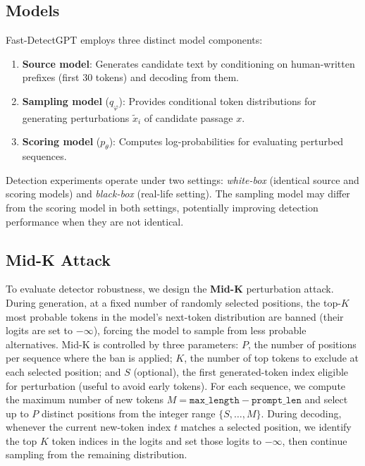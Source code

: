 \documentclass[11pt]{article}
\begin{document}
\subsection{Models}

Fast-DetectGPT employs three distinct model components:
\begin{enumerate}[leftmargin=*]
  \item \textbf{Source model}: Generates candidate text by conditioning on human-written prefixes (first 30 tokens) and decoding from them.
  \item \textbf{Sampling model} ($q_\varphi$): Provides conditional token distributions for generating perturbations $\tilde{x}_i$ of candidate passage $x$.
  \item \textbf{Scoring model} ($p_\theta$): Computes log-probabilities for evaluating perturbed sequences.
\end{enumerate}
Detection experiments operate under two settings: \textit{white-box} (identical source and scoring models) and \textit{black-box} (real-life setting). The sampling model may differ from the scoring model in both settings, potentially improving detection performance when they are not identical.

\subsection{Mid-K Attack}
To evaluate detector robustness, we design the \textbf{Mid-K} perturbation attack. During generation, at a fixed number of randomly selected positions, the top-$K$ most probable tokens in the model’s next-token distribution are banned (their logits are set to $-\infty$), forcing the model to sample from less probable alternatives. 
Mid-K is controlled by three parameters: $P$, the number of positions per sequence where the ban is applied; $K$, the number of top tokens to exclude at each selected position; and $S$ (optional), the first generated-token index eligible for perturbation (useful to avoid early tokens). For each sequence, we compute the maximum number of new tokens $M = \texttt{max\_length} - \texttt{prompt\_len}$ and select up to $P$ distinct positions from the integer range $\{S, \ldots, M\}$. During decoding, whenever the current new-token index $t$ matches a selected position, we identify the top $K$ token indices in the logits and set those logits to $-\infty$, then continue sampling from the remaining distribution.
\end{document}
